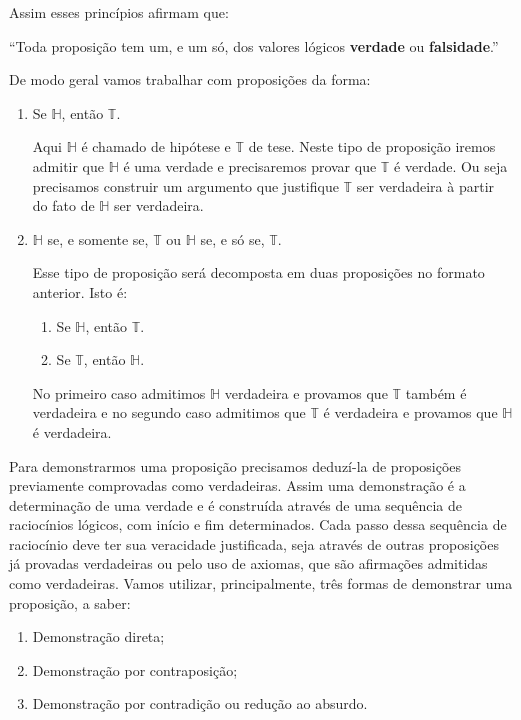 Assim esses princípios afirmam que:
\begin{center}
    ``Toda proposição tem um, e um só, dos valores lógicos \textbf{verdade} ou \textbf{falsidade}.''
\end{center}

De modo geral vamos trabalhar com proposições da forma:
\begin{enumerate}[label={\roman*})]
    \item Se $\mathbb{H}$, então $\mathbb{T}$.

    Aqui $\mathbb{H}$ é chamado de hipótese e $\mathbb{T}$ de tese. Neste tipo de proposição iremos admitir que $\mathbb{H}$ é uma verdade e precisaremos provar que $\mathbb{T}$ é verdade. Ou seja precisamos construir um argumento que justifique $\mathbb{T}$ ser verdadeira à partir do fato de $\mathbb{H}$ ser verdadeira.

    \item $\mathbb{H}$ se, e somente se, $\mathbb{T}$ ou $\mathbb{H}$ se, e só se, $\mathbb{T}$.

    Esse tipo de proposição será decomposta em duas proposições no formato anterior. Isto é:
    \begin{enumerate}[label={\alph*})]
        \item Se $\mathbb{H}$, então $\mathbb{T}$.
        \item Se $\mathbb{T}$, então $\mathbb{H}$.
    \end{enumerate}

    No primeiro caso admitimos $\mathbb{H}$ verdadeira e provamos que $\mathbb{T}$ também é verdadeira e no segundo caso admitimos que $\mathbb{T}$ é verdadeira e provamos que $\mathbb{H}$ é verdadeira.
\end{enumerate}

Para demonstrarmos uma proposição precisamos deduzí-la de proposições previamente comprovadas como verdadeiras. Assim uma demonstração é a determinação de uma verdade e é construída através de uma sequência de raciocínios lógicos, com início e fim determinados. Cada passo dessa sequência de raciocínio deve ter sua veracidade justificada, seja através de outras proposições já provadas verdadeiras ou pelo uso de axiomas, que são afirmações admitidas como verdadeiras. Vamos utilizar, principalmente, três formas de demonstrar uma proposição, a saber:
\begin{enumerate}[label={\roman*})]
    \item Demonstração direta;
    \item Demonstração por contraposição;
    \item Demonstração por contradição ou redução ao absurdo.
\end{enumerate}

